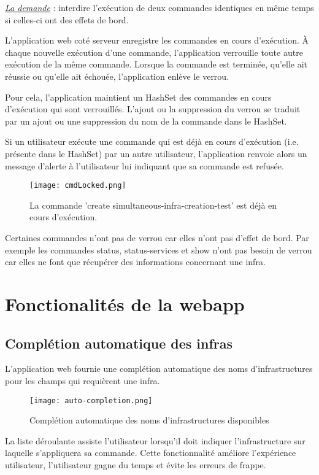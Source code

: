 \underline{\textit{La demande}} : interdire l'exécution de deux commandes identiques en même temps si
celles-ci ont des effets de bord.

L'application web coté serveur enregistre les commandes en cours d'exécution.
À chaque nouvelle exécution d'une commande, l'application verrouille toute autre
exécution de la même commande. Lorsque la commande est terminée, qu'elle ait
réussie ou qu'elle ait échouée, l'application enlève le verrou.

Pour cela, l'application maintient un HashSet des commandes en cours d'exécution
qui sont verrouillés. L'ajout ou la suppression du verrou se traduit par un
ajout ou une suppression du nom de la commande dans le HashSet.

Si un utilisateur exécute une commande qui est déjà en cours d'exécution
(i.e. présente dans le HashSet) par un autre utilisateur, l'application renvoie
alors un message d'alerte à l'utilisateur lui indiquant que sa commande est refusée.

\begin{figure}[H]
  \texttt{[image: cmdLocked.png]}
  \caption{La commande 'create simultaneous-infra-creation-test' est déjà en
    cours d'exécution.}
\end{figure}

Certaines commandes n'ont pas de verrou car elles n'ont pas d'effet de bord.
Par exemple les commandes status, status-services et show n'ont pas besoin
de verrou car elles ne font que récupérer des informations concernant une infra.


\section{Fonctionalités de la webapp}

\subsection{Complétion automatique des infras}

L'application web fournie une complétion automatique des noms d'infrastructures
pour les champs qui requièrent une infra.

\begin{figure}[H]
  \texttt{[image: auto-completion.png]}
  \caption{Complétion automatique des noms d'infrastructures disponibles}
\end{figure}

La liste déroulante assiste l'utilisateur lorsqu'il doit indiquer
l'infrastructure sur laquelle s'appliquera sa commande.
Cette fonctionnalité améliore l'expérience utilisateur, l'utilisateur gagne du
temps et évite les erreurs de frappe.

